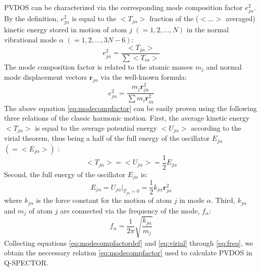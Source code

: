 \documentclass[10pt]{article}
\begin{document}
\vskip 10pt
PVDOS can be characterized via the corresponding mode composition factor $e^2_{j\alpha}$. By the definition, $e^2_{j\alpha}$ is equal to the $<T_{j\alpha}>$ fraction of the ($<...>$ averaged) kinetic energy stored in motion of atom $j$ $(=1,2,...,N)$ in the normal vibrational mode $\alpha$ $(=1,2,...,3N-6)$:
\begin{equation}
\label{eq:modecompfactordef}
e^2_{j\alpha} = \frac{<T_{j\alpha}>}{\sum<T_{i\alpha}>} 
\end{equation}
The mode composition factor is related to the atomic masses $m_j$ and normal mode displacement vectors $\boldsymbol{r}_{j\alpha}$ 
via the well-known formula: 
\begin{equation}
\label{eq:modecompfactor}
e^2_{j\alpha} = \frac{m_j \boldsymbol{r}^2_{j\alpha}}{\sum m_i\boldsymbol{r}^2_{i\alpha}} 
\end{equation}
The above equation \ref{eq:modecompfactor} can be easily proven using the following three relations of the classic harmonic motion.
First, the average kinetic energy $<T_{j\alpha}>$ is equal to the average potential energy $<U_{j\alpha}>$ according to the virial theorem, 
thus being a half of the full energy of the oscillator $E_{j\alpha}$ $(= <E_{j\alpha}>)$ :
\begin{equation}
\label{eq:virial}
<T_{j\alpha}> = <U_{j\alpha}> = \frac{1}{2} E_{j\alpha}
\end{equation}
Second, the full energy of the oscillator $E_{j\alpha}$ is:
\begin{equation}
\label{eq:full}
E_{j\alpha} = U_{j\alpha}\Big\lvert_{T_{j\alpha} = 0} = \frac{1}{2} k_{j\alpha} \boldsymbol{r}^2_{j\alpha}  
\end{equation}
where $k_{j\alpha}$ is the force constant for the motion of atom $j$ in mode $\alpha$. Third, $k_{j\alpha}$ and $m_j$ of atom $j$ are 
connected via the frequency of the mode, $f_\alpha$:
\begin{equation}
\label{eq:freq}
f_\alpha = \frac{1}{2\pi} \sqrt{\frac{k_{j\alpha}}{m_j}}
\end{equation} 
Collecting equations \ref{eq:modecompfactordef} and \ref{eq:virial} through \ref{eq:freq}, we obtain the neccessary relation \ref{eq:modecompfactor}
used to calculate PVDOS in \textsf{Q-SPECTOR}.  
\end{document}
